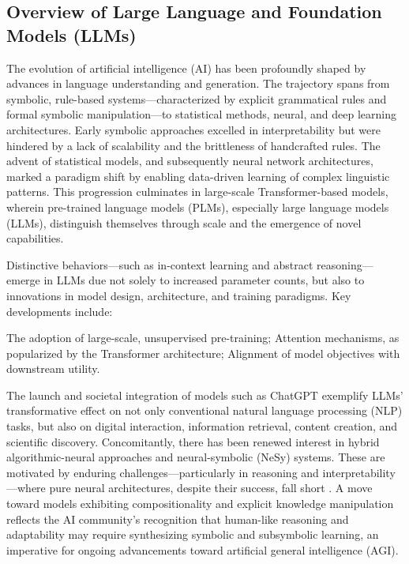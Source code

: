 \documentclass[sigconf]{acmart}
\begin{document}
\subsection{Overview of Large Language and Foundation Models (LLMs)}

The evolution of artificial intelligence (AI) has been profoundly shaped by advances in language understanding and generation. The trajectory spans from symbolic, rule-based systems—characterized by explicit grammatical rules and formal symbolic manipulation—to statistical methods, neural, and deep learning architectures. Early symbolic approaches excelled in interpretability but were hindered by a lack of scalability and the brittleness of handcrafted rules. The advent of statistical models, and subsequently neural network architectures, marked a paradigm shift by enabling data-driven learning of complex linguistic patterns. This progression culminates in large-scale Transformer-based models, wherein pre-trained language models (PLMs), especially large language models (LLMs), distinguish themselves through scale and the emergence of novel capabilities.

Distinctive behaviors—such as in-context learning and abstract reasoning—emerge in LLMs due not solely to increased parameter counts, but also to innovations in model design, architecture, and training paradigms. Key developments include:

The adoption of large-scale, unsupervised pre-training;
Attention mechanisms, as popularized by the Transformer architecture;
Alignment of model objectives with downstream utility.

The launch and societal integration of models such as ChatGPT exemplify LLMs' transformative effect on not only conventional natural language processing (NLP) tasks, but also on digital interaction, information retrieval, content creation, and scientific discovery. Concomitantly, there has been renewed interest in hybrid algorithmic-neural approaches and neural-symbolic (NeSy) systems. These are motivated by enduring challenges—particularly in reasoning and interpretability—where pure neural architectures, despite their success, fall short \cite{ref42,ref49,ref54,ref86}. A move toward models exhibiting compositionality and explicit knowledge manipulation reflects the AI community’s recognition that human-like reasoning and adaptability may require synthesizing symbolic and subsymbolic learning, an imperative for ongoing advancements toward artificial general intelligence (AGI).
\end{document}
